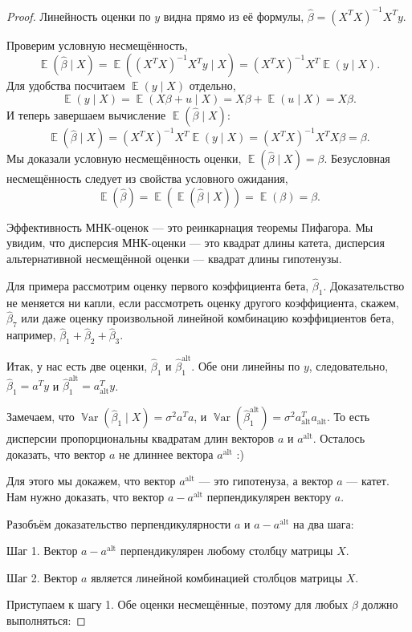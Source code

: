 \documentclass[12pt]{article}
\DeclareMathOperator{\Var}{\mathbb{V}ar}
\DeclareMathOperator{\E}{\mathbb{E}}
\newcommand{\hb}{\hat{\beta}}
\newcommand{\alt}{\text{alt}}
\begin{document}
\begin{proof}
Линейность оценки по $y$ видна прямо из её формулы, $\hb = (X^TX)^{-1}X^Ty$.

Проверим условную несмещённость, 
\[
\E(\hb \mid X) = \E((X^TX)^{-1}X^Ty \mid X) = (X^TX)^{-1}X^T\E(y \mid X).
\]
Для удобства посчитаем $\E(y \mid X)$ отдельно,
\[
\E(y \mid X) = \E(X\beta + u \mid X) = X\beta + \E(u \mid X) = X\beta.
\]
И теперь завершаем вычисление $\E(\hb \mid X)$:
\[
\E(\hb \mid X) = (X^TX)^{-1}X^T\E(y \mid X) = (X^TX)^{-1}X^TX\beta = \beta.
\]
Мы доказали условную несмещённость оценки, $\E(\hb \mid X) = \beta$.
Безусловная несмещённость следует из свойства условного ожидания,
\[
\E(\hb) = \E(\E(\hb \mid X)) = \E(\beta) = \beta.
\]

Эффективность МНК-оценок — это реинкарнация теоремы Пифагора. 
Мы увидим, что дисперсия МНК-оценки — это квадрат длины катета, 
дисперсия альтернативной несмещённой оценки — квадрат длины гипотенузы.

Для примера рассмотрим оценку первого коэффициента бета, $\hb_1$.
Доказательство не меняется ни капли, если рассмотреть оценку другого коэффициента, скажем, $\hb_7$ или даже оценку произвольной линейной комбинацию коэффициентов бета, например, $\hb_1 + \hb_2 + \hb_3$.

Итак, у нас есть две оценки, $\hat\beta_1$ и $\hat\beta_1^{\alt}$. 
Обе они линейны по $y$, следовательно, $\hat\beta_1 = a^T y$ и $\hat\beta_1^{\alt} = a^T_{\alt} y$.


Замечаем, что $\Var(\hat\beta_1 \mid X) = \sigma^2 a^Ta$, и $\Var(\hat\beta_1^{\alt}) = \sigma^2 a_{\alt}^Ta_{\alt}$. 
То есть дисперсии пропорциональны квадратам длин векторов $a$ и $a^{\alt}$. 
Осталось доказать, что вектор $a$ не длиннее вектора $a^{\alt}$ :)

Для этого мы докажем, что вектор $a^{\alt}$ — это гипотенуза, а вектор $a$ — катет. 
Нам нужно доказать, что вектор $a - a^{\alt}$ перпендикулярен вектору $a$.

Разобъём доказательство перпендикулярности $a$ и $a-a^{\alt}$ на два шага:

Шаг 1. Вектор $a - a^{\alt}$ перпендикулярен любому столбцу матрицы $X$.

Шаг 2. Вектор $a$ является линейной комбинацией столбцов матрицы $X$.




Приступаем к шагу 1. Обе оценки несмещённые, поэтому для любых $\beta$ должно выполняться:


\end{proof}
\end{document}
